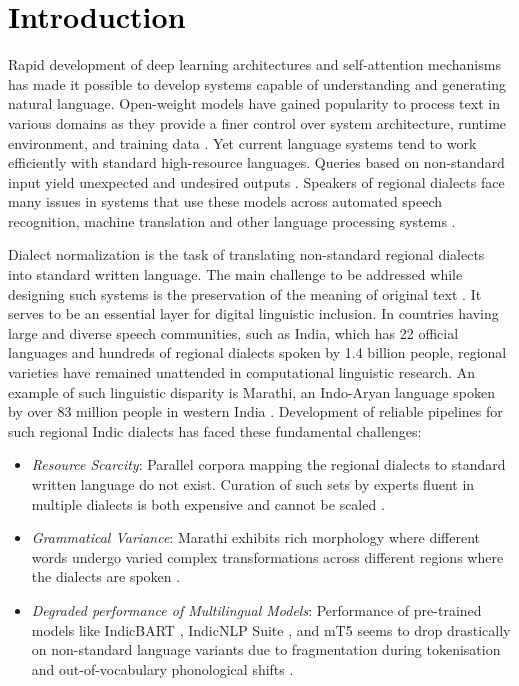 \documentclass[11pt, a4paper]{article}
\begin{document}
\section{\textcolor{black}{Introduction}}

Rapid development of deep learning architectures and self-attention mechanisms \citep{vaswani2017attention} has made it possible to develop systems capable of understanding and generating natural language. Open-weight models have gained popularity to process text in various domains as they provide a finer control over system architecture, runtime environment, and training data \citep{dubey2024llama3}. Yet current language systems tend to work efficiently with standard high-resource languages. Queries based on non-standard input yield unexpected and undesired outputs \citep{joshi2020state}. Speakers of regional dialects face many issues in systems that use these models across automated speech recognition, machine translation and other language processing systems \citep{koenecke2020racial,zampieri2020nlp}.

Dialect normalization is the task of translating non-standard regional dialects into standard written language. The main challenge to be addressed while designing such systems is the preservation of the meaning of original text \citep{blaschke2024what}. It serves to be an essential layer for digital linguistic inclusion. In countries having large and diverse speech communities, such as India, which has 22 official languages and hundreds of regional dialects spoken by 1.4 billion people, regional varieties have remained unattended in computational linguistic research. An example of such linguistic disparity is Marathi, an Indo-Aryan language spoken by over 83 million people in western India \citep{kulkarni2023variation}. Development of reliable pipelines for such regional Indic dialects has faced these fundamental challenges:
\begin{itemize}
    \item {\fontsize{11pt}{14pt}\selectfont\itshape Resource Scarcity}: Parallel corpora mapping the regional dialects to standard written language do not exist. Curation of such sets by experts fluent in multiple dialects is both expensive and cannot be scaled \citep{blaschke2024what,dhasmana2026dialect}.
    \item {\fontsize{11pt}{14pt}\selectfont\itshape Grammatical Variance}: Marathi exhibits rich morphology where different words undergo varied complex transformations across different regions where the dialects are spoken \citep{ansary2024unicode,joshi2025survey}.
    \item {\fontsize{11pt}{14pt}\selectfont\itshape Degraded performance of Multilingual Models}: Performance of pre-trained models like IndicBART \citep{dabre2022indicbart}, IndicNLP Suite \citep{kakwani2020indicnlpsuite}, and mT5 \citep{xue2021mt5} seems to drop drastically on non-standard language variants due to fragmentation during tokenisation and out-of-vocabulary phonological shifts \citep{joshi2020state,kumar2024indicdialect}.
\end{itemize}
\end{document}
